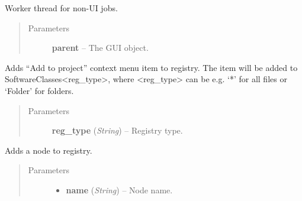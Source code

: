 \documentclass[letterpaper,10pt,english]{sphinxmanual}
\begin{document}

\begin{fulllineitems}
\label{threads:threads.worker.WORKER_THREAD}
Worker thread for non-UI jobs.
\begin{quote}\begin{description}
\item[{Parameters}] \leavevmode
\textbf{parent} -- The GUI object.

\end{description}\end{quote}

\begin{fulllineitems}
\label{threads:threads.worker.WORKER_THREAD.add_project_registry_entry}
Adds ``Add to project'' context menu item to registry. The item
will be added to SoftwareClasses\textless{}reg\_type\textgreater{}, where \textless{}reg\_type\textgreater{}
can be e.g. `*' for all files or `Folder' for folders.
\begin{quote}\begin{description}
\item[{Parameters}] \leavevmode
\textbf{reg\_type} (\emph{String}) -- Registry type.

\end{description}\end{quote}

\end{fulllineitems}


\begin{fulllineitems}
\label{threads:threads.worker.WORKER_THREAD.add_registry_entry}
Adds a node to registry.
\begin{quote}\begin{description}
\item[{Parameters}] \leavevmode\begin{itemize}
\item {} 
\textbf{name} (\emph{String}) -- Node name.


\end{itemize}
\end{description}
\end{quote}
\end{fulllineitems}
\end{fulllineitems}
\end{document}
